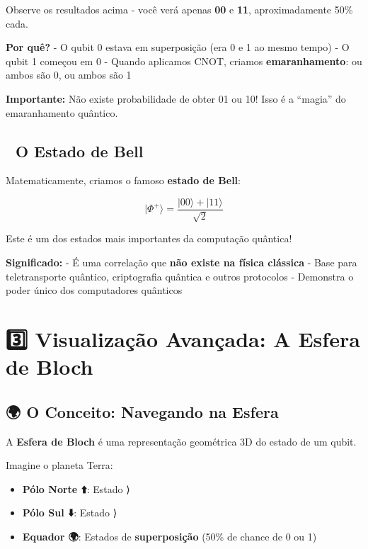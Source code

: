 \documentclass[
  brazilian,
]{report}
\providecommand{\tightlist}{%
  \setlength{\itemsep}{0pt}\setlength{\parskip}{0pt}}
\begin{document}
Observe os resultados acima - você verá apenas \textbf{00} e
\textbf{11}, aproximadamente 50\% cada.

\textbf{Por quê?} - O qubit 0 estava em superposição (era 0 e 1 ao mesmo
tempo) - O qubit 1 começou em 0 - Quando aplicamos CNOT, criamos
\textbf{emaranhamento}: ou ambos são 0, ou ambos são 1

\textbf{Importante:} Não existe probabilidade de obter 01 ou 10! Isso é
a ``magia'' do emaranhamento quântico.

\subsection{🎯 O Estado de Bell}\label{o-estado-de-bell}

Matematicamente, criamos o famoso \textbf{estado de Bell}:

\[|\Phi^+\rangle = \frac{|00\rangle + |11\rangle}{\sqrt{2}}\]

Este é um dos estados mais importantes da computação quântica!

\textbf{Significado:} - É uma correlação que \textbf{não existe na
física clássica} - Base para teletransporte quântico, criptografia
quântica e outros protocolos - Demonstra o poder único dos computadores
quânticos

\section{3️⃣ Visualização Avançada: A Esfera de
Bloch}\label{visualizauxe7uxe3o-avanuxe7ada-a-esfera-de-bloch}

\subsection{🌍 O Conceito: Navegando na
Esfera}\label{o-conceito-navegando-na-esfera}

A \textbf{Esfera de Bloch} é uma representação geométrica 3D do estado
de um qubit.

Imagine o planeta Terra:

\begin{itemize}
\tightlist
\item
  \textbf{Pólo Norte ⬆️}: Estado ⟩
\item
  \textbf{Pólo Sul ⬇️}: Estado ⟩
\item
  \textbf{Equador 🌍}: Estados de \textbf{superposição} (50\% de chance
  de 0 ou 1)
\end{itemize}
\end{document}
